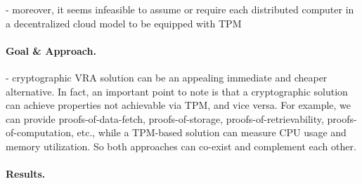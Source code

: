 - moreover, it seems infeasible to assume or require each distributed computer in a decentralized cloud model to be equipped with TPM

\paragraph{Goal \& Approach.}
- cryptographic VRA solution can be an appealing immediate and cheaper alternative. In fact, an important point to note is that a cryptographic solution can achieve properties not achievable via TPM, and vice versa. For example, we can provide proofs-of-data-fetch, proofs-of-storage, proofs-of-retrievability, proofs-of-computation, etc., while a TPM-based solution can measure CPU usage and memory utilization. So both approaches can co-exist and complement each other.


\paragraph{Results.}


